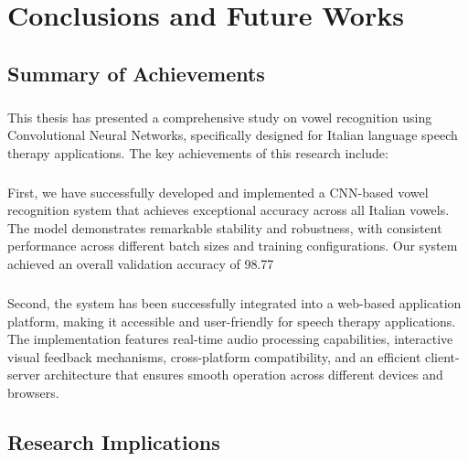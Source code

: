 
\chapter{Conclusions and Future Works}
\label{chp:conclusions}

\section{Summary of Achievements}
\label{sec:achievements}

\paragraph{}
This thesis has presented a comprehensive study on vowel recognition using Convolutional Neural Networks, specifically designed for Italian language speech therapy applications. The key achievements of this research include:

\paragraph{}
First, we have successfully developed and implemented a CNN-based vowel recognition system that achieves exceptional accuracy across all Italian vowels. The model demonstrates remarkable stability and robustness, with consistent performance across different batch sizes and training configurations. Our system achieved an overall validation accuracy of 98.77%

\paragraph{}
Second, the system has been successfully integrated into a web-based application platform, making it accessible and user-friendly for speech therapy applications. The implementation features real-time audio processing capabilities, interactive visual feedback mechanisms, cross-platform compatibility, and an efficient client-server architecture that ensures smooth operation across different devices and browsers.

\section{Research Implications}
\label{sec:implications}


